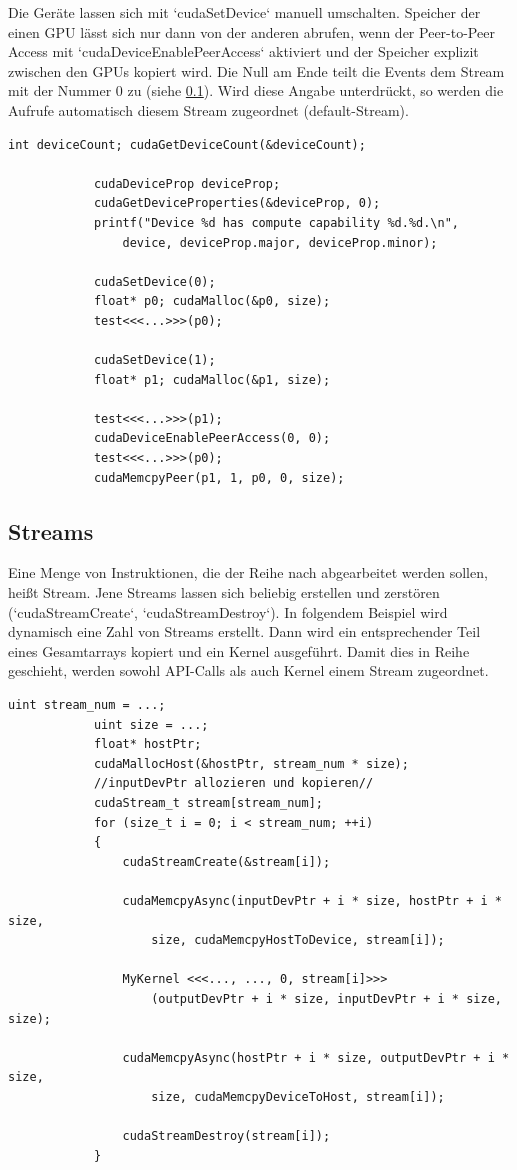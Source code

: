 		Die Geräte lassen sich mit \li`cudaSetDevice` manuell umschalten. Speicher der einen GPU lässt sich nur dann von der anderen abrufen, wenn der Peer-to-Peer Access mit \li`cudaDeviceEnablePeerAccess` aktiviert und der Speicher explizit zwischen den GPUs kopiert wird. Die Null am Ende teilt die Events dem Stream mit der Nummer 0 zu (siehe \ref{streams}). Wird diese Angabe unterdrückt, so werden die Aufrufe automatisch diesem \Gls{Stream} zugeordnet (default-\Gls{Stream}).
		\begin{lstlisting}[caption=Device Peer-to-Peer Access]
			int deviceCount; cudaGetDeviceCount(&deviceCount);

			cudaDeviceProp deviceProp;
			cudaGetDeviceProperties(&deviceProp, 0);
			printf("Device %d has compute capability %d.%d.\n",
    			device, deviceProp.major, deviceProp.minor);
           
			cudaSetDevice(0);
			float* p0; cudaMalloc(&p0, size);
			test<<<...>>>(p0);
			
			cudaSetDevice(1);
			float* p1; cudaMalloc(&p1, size);
			
			test<<<...>>>(p1);
			cudaDeviceEnablePeerAccess(0, 0);
			test<<<...>>>(p0);
			cudaMemcpyPeer(p1, 1, p0, 0, size);
		\end{lstlisting}

	
		\subsection{Streams}\label{streams}
		Eine Menge von Instruktionen, die der Reihe nach abgearbeitet werden sollen, heißt \Gls{Stream}. Jene \Glspl{Stream} lassen sich beliebig erstellen und zerstören (\li`cudaStreamCreate`, \li`cudaStreamDestroy`). In folgendem Beispiel wird dynamisch eine Zahl von \Glspl{Stream} erstellt. Dann wird ein entsprechender Teil eines Gesamtarrays kopiert und ein Kernel ausgeführt. Damit dies in Reihe geschieht, werden sowohl \Gls{API}-Calls als auch \Gls{Kernel} einem \Gls{Stream} zugeordnet.	
		
		\begin{lstlisting}[caption=Streams]
			uint stream_num = ...;
			uint size = ...;	    
			float* hostPtr;
			cudaMallocHost(&hostPtr, stream_num * size);	
			//inputDevPtr allozieren und kopieren//
			cudaStream_t stream[stream_num];
			for (size_t i = 0; i < stream_num; ++i)
			{
				cudaStreamCreate(&stream[i]);
    			
				cudaMemcpyAsync(inputDevPtr + i * size, hostPtr + i * size,
					size, cudaMemcpyHostToDevice, stream[i]);
    			
				MyKernel <<<..., ..., 0, stream[i]>>>
					(outputDevPtr + i * size, inputDevPtr + i * size, size);
				
				cudaMemcpyAsync(hostPtr + i * size, outputDevPtr + i * size,
					size, cudaMemcpyDeviceToHost, stream[i]);
								
				cudaStreamDestroy(stream[i]);
			}
		\end{lstlisting}


